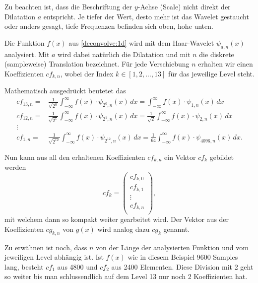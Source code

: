 Zu beachten ist, dass die Beschriftung der $y$-Achse (Scale) nicht direkt der Dilatation $a$ entspricht.
Je tiefer der Wert, desto mehr ist das Wavelet gestaucht oder anders gesagt, tiefe Frequenzen befinden sich oben, hohe unten.

Die Funktion $f(x)$ aus \ref{deconvolve:1d} wird mit dem Haar-Wavelet $\psi_{a,n}(x)$ analysiert.
Mit $a$ wird dabei natürlich die Dilatation und mit $n$ die diskrete (sampleweise) Translation bezeichnet.
Für jede Verschiebung $n$ erhalten wir einen Koeffizienten $cf_{k,n}$, wobei der Index $k\in[1,2,...,13]$ für das jeweilige Level steht. 

Mathematisch ausgedrückt beutetet das
\begin{align*}
	cf_{13,n} =& \frac{1}{\sqrt{2^0}}\int_{-\infty}^{\infty}f(x)\cdot\psi_{2^0, n}(x)\,dx = \int_{-\infty}^{\infty}f(x)\cdot\psi_{1, n}(x)\,dx\\
	cf_{12,n} =& \frac{1}{\sqrt{2^1}}\int_{-\infty}^{\infty}f(x)\cdot\psi_{2^1, n}(x)\,dx = \frac{1}{\sqrt{2}}\int_{-\infty}^{\infty}f(x)\cdot\psi_{2, n}(x)\,dx\\
	\vdots\\
	cf_{1,n} =& \frac{1}{\sqrt{2^{12}}}\int_{-\infty}^{\infty}f(x)\cdot\psi_{2^{12}, n}(x)\,dx = \frac{1}{64}\int_{-\infty}^{\infty}f(x)\cdot\psi_{4096, n}(x)\,dx.
\end{align*}

Nun kann aus all den erhaltenen Koeffizienten $cf_{k,n}$ ein Vektor $cf_k$ gebildet werden
$$cf_k = \left(\begin{array}{c}
	cf_{k,0}\\
	cf_{k,1}\\
	\vdots\\
	cf_{k,n}\\
\end{array}\right),$$
mit welchem dann so kompakt weiter gearbeitet wird.
Der Vektor aus der Koeffizienten $cg_{k,n}$ von $g(x)$ wird analog dazu $cg_k$ genannt.

Zu erwähnen ist noch, dass $n$ von der Länge der analysierten Funktion und vom jeweiligen Level abhängig ist.
Ist $f(x)$ wie in diesem Beispiel 9600 Samples lang, besteht $cf_1$ aus 4800 und $cf_2$ aus 2400 Elementen.
Diese Division mit 2 geht so weiter bis man schlussendlich auf dem Level 13 nur noch 2 Koeffizienten hat.

